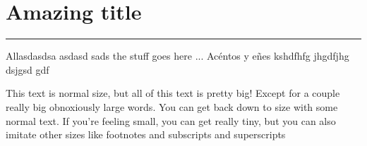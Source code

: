 
\chapter{Amazing title}\label{capit:cap1}
\vspace{-2.0325ex}%
\noindent
\rule{\textwidth}{0.5pt}
\vspace{-5.5ex}%
\newcommand{\pushline}{\Indp}%


Allasdasdsa asdasd sads the stuff goes here ... Acéntos y eñes kshdfhfg jhgdfjhg dsjgsd gdf 

This text is normal size, but
\large
all of this text is pretty big!
Except for a couple
{\Large really} big
{\LARGE obnoxiously} large
{\Huge words}.
You can get back down to size with some
{\normalsize normal text}.
If you're feeling
{\small small}, you can get really
{\tiny tiny}, but you can also imitate other sizes like
{\footnotesize footnotes} and
{\scriptsize subscripts and superscripts}







\newpage
